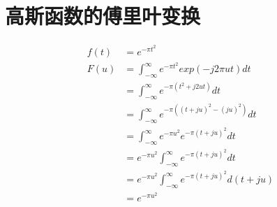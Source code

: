 \section{高斯函数的傅里叶变换}
\begin{equation}
\begin{aligned}
f(t)&=e^{-\pi t^{2}}\\
F(u)&=\int^{\infty}_{-\infty}e^{-\pi t^{2}}exp(-j2\pi ut)dt\\
&=\int^{\infty}_{-\infty}e^{-\pi(t^{2}+j2ut)}dt\\
&=\int^{\infty}_{-\infty}e^{-\pi((t+ju)^{2}-(ju)^{2})}dt\\
&=\int^{\infty}_{-\infty}e^{-\pi u^{2}}e^{-\pi(t+ju)^{2}}dt\\
&=e^{-\pi u^{2}}\int^{\infty}_{-\infty}e^{-\pi(t+ju)^{2}}dt\\
&=e^{-\pi u^{2}}\int^{\infty}_{-\infty}e^{-\pi(t+ju)^{2}}d(t+ju)\\
&=e^{-\pi u^{2}}
\end{aligned}
\end{equation}
\newpage
